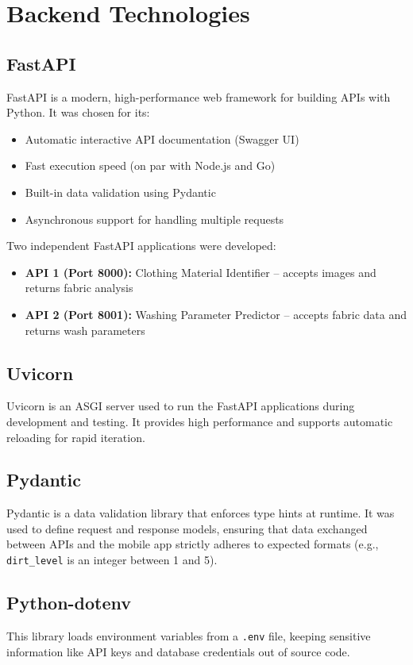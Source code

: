 \section{Backend Technologies}

\subsection{FastAPI}
FastAPI is a modern, high-performance web framework for building APIs with Python. It was chosen for its:
\begin{itemize}
    \item Automatic interactive API documentation (Swagger UI)
    \item Fast execution speed (on par with Node.js and Go)
    \item Built-in data validation using Pydantic
    \item Asynchronous support for handling multiple requests
\end{itemize}
Two independent FastAPI applications were developed:
\begin{itemize}
    \item \textbf{API 1 (Port 8000):} Clothing Material Identifier – accepts images and returns fabric analysis
    \item \textbf{API 2 (Port 8001):} Washing Parameter Predictor – accepts fabric data and returns wash parameters
\end{itemize}

\subsection{Uvicorn}
Uvicorn is an ASGI server used to run the FastAPI applications during development and testing. It provides high performance and supports automatic reloading for rapid iteration.

\subsection{Pydantic}
Pydantic is a data validation library that enforces type hints at runtime. It was used to define request and response models, ensuring that data exchanged between APIs and the mobile app strictly adheres to expected formats (e.g., \texttt{dirt\_level} is an integer between 1 and 5).

\subsection{Python-dotenv}
This library loads environment variables from a \texttt{.env} file, keeping sensitive information like API keys and database credentials out of source code.

